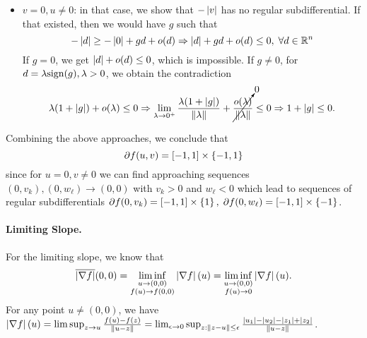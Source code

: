 \documentclass[10pt]{article}
\begin{document}
\begin{itemize}
\item $v = 0, u \neq 0$: in that case, we show that $-\left| v \right|$ has no regular
subdifferential. If that existed, then we would have $g$ such that
\[
    -\left| d \right| \geq -\left| 0 \right| + g d + o(d) \Rightarrow \left| d \right| + g d + o(d) \leq 0,
    \; \forall d \in \mathbb{R}^n
\]
If $g = 0$, we get $\left| d \right| + o(d) \leq 0$, which is impossible. If $g \neq 0$,
for $d = \lambda \mathrm{sign}(g), \lambda > 0$, we obtain the contradiction
\[
    \lambda (1 + \left| g \right|) + o(\lambda) \leq 0 \Rightarrow
    \lim_{\lambda \to 0^+} \frac{\lambda (1 + \left| g \right|)}{\left \| \lambda \right \|}
    + \cancelto{0}{\frac{o(\lambda)}{\left \| \lambda \right \|}} \leq 0 \Rightarrow
    1 + \left| g \right| \leq 0.
\]
\end{itemize}
Combining the above approaches, we conclude that
\[
    \partial f(u, v) = [-1, 1] \times \left\{ -1, 1 \right\}
\]
since for $u = 0, v \neq 0$ we can find approaching sequences $(0, v_k), (0,
w_{\ell}) \to (0, 0)$ with $v_k > 0$ and $w_{\ell} < 0$ which lead to sequences
of regular subdifferentials $\partial f(0, v_k) = [-1, 1] \times \left\{ 1 \right\}, \;
\partial f(0, w_{\ell}) = [-1, 1] \times \left\{ -1 \right\}$.


\paragraph{Limiting Slope.}
For the limiting slope, we know that
\[
    \overline{\left| \nabla f \right|}(0, 0) = \liminf_{\substack{u \to (0, 0) \\ f(u)
    \to f(0, 0)}} \left| \nabla f \right|(u) = \liminf_{\substack{u \to (0, 0) \\ f(u)
    \to 0}} \left| \nabla f \right|(u).
\]
For any point $u \neq (0, 0)$, we have $\left| \nabla f \right|(u) =
\limsup_{z \to u} \frac{f(u) - f(z)}{\left \| u - z \right \|} = \lim_{\epsilon \to 0}
\sup_{z : \left \| z - u \right \| \leq \epsilon}
\frac{\left| u_1 \right| - \left| u_2 \right| - \left| z_1 \right| + \left| z_2 \right|}{\left \| u - z \right \|}$.
\end{document}
